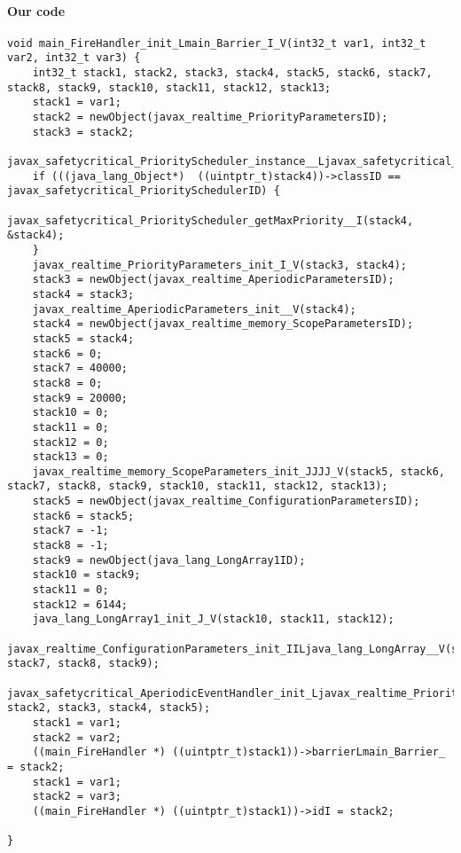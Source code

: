 \paragraph{Our code}\hfill
\begin{lstlisting}[firstnumber=2261]
void main_FireHandler_init_Lmain_Barrier_I_V(int32_t var1, int32_t var2, int32_t var3) {
	int32_t stack1, stack2, stack3, stack4, stack5, stack6, stack7, stack8, stack9, stack10, stack11, stack12, stack13;
	stack1 = var1;
	stack2 = newObject(javax_realtime_PriorityParametersID);
	stack3 = stack2;
	javax_safetycritical_PriorityScheduler_instance__Ljavax_safetycritical_PriorityScheduler_(&stack4);
	if (((java_lang_Object*)  ((uintptr_t)stack4))->classID == javax_safetycritical_PrioritySchedulerID) {
		javax_safetycritical_PriorityScheduler_getMaxPriority__I(stack4, &stack4);
	}
	javax_realtime_PriorityParameters_init_I_V(stack3, stack4);
	stack3 = newObject(javax_realtime_AperiodicParametersID);
	stack4 = stack3;
	javax_realtime_AperiodicParameters_init__V(stack4);
	stack4 = newObject(javax_realtime_memory_ScopeParametersID);
	stack5 = stack4;
	stack6 = 0;
	stack7 = 40000;
	stack8 = 0;
	stack9 = 20000;
	stack10 = 0;
	stack11 = 0;
	stack12 = 0;
	stack13 = 0;
	javax_realtime_memory_ScopeParameters_init_JJJJ_V(stack5, stack6, stack7, stack8, stack9, stack10, stack11, stack12, stack13);
	stack5 = newObject(javax_realtime_ConfigurationParametersID);
	stack6 = stack5;
	stack7 = -1;
	stack8 = -1;
	stack9 = newObject(java_lang_LongArray1ID);
	stack10 = stack9;
	stack11 = 0;
	stack12 = 6144;
	java_lang_LongArray1_init_J_V(stack10, stack11, stack12);
	javax_realtime_ConfigurationParameters_init_IILjava_lang_LongArray__V(stack6, stack7, stack8, stack9);
	javax_safetycritical_AperiodicEventHandler_init_Ljavax_realtime_PriorityParameters_Ljavax_realtime_AperiodicParameters_Ljavax_realtime_memory_ScopeParameters_Ljavax_realtime_ConfigurationParameters__V(stack1, stack2, stack3, stack4, stack5);
	stack1 = var1;
	stack2 = var2;
	((main_FireHandler *) ((uintptr_t)stack1))->barrierLmain_Barrier_ = stack2;
	stack1 = var1;
	stack2 = var3;
	((main_FireHandler *) ((uintptr_t)stack1))->idI = stack2;

}
\end{lstlisting}

